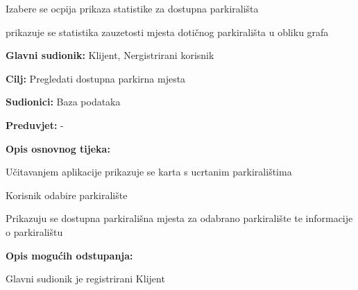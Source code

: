 \begin{packed_item}
\begin{packed_item}
\begin{packed_item}
						\item[] \begin{packed_enum}
	
							\item Izabere se ocpija prikaza statistike za dostupna parkirališta
							\item prikazuje se statistika zauzetosti mjesta dotičnog parkirališta u obliku grafa
							
							
						\end{packed_enum}

					\end{packed_item}

                        \noindent {}
					\begin{packed_item}
	
						\item \textbf{Glavni sudionik: }Klijent, Nergistrirani korisnik
						\item  \textbf{Cilj:} Pregledati dostupna parkirna mjesta
						\item  \textbf{Sudionici:} Baza podataka
						\item  \textbf{Preduvjet:} -
						\item  \textbf{Opis osnovnog tijeka:}
						
						\item[] \begin{packed_enum}
	
							\item Učitavanjem aplikacije prikazuje se karta s ucrtanim parkiralištima
							\item Korisnik odabire parkiralište
							\item Prikazuju se dostupna parkirališna mjesta za odabrano parkiralište te informacije o parkiralištu
							
						\end{packed_enum}

                            \item  \textbf{Opis mogućih odstupanja:}
						
						\item[] \begin{packed_item}
	
							\item[3.a] Glavni sudionik je registrirani Klijent
							\item[] \begin{packed_enum}
								

\end{packed_enum}
\end{packed_item}
\end{packed_item}
\end{packed_item}
\end{packed_item}

